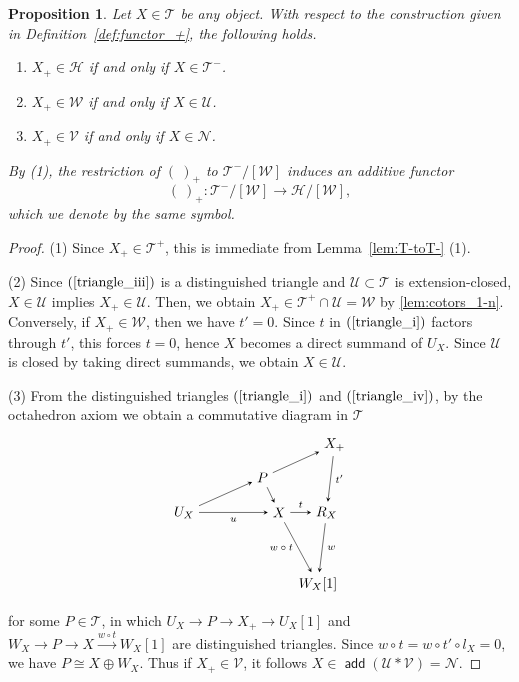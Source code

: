 \documentclass[a4paper,reqno,10pt]{amsart}
\newtheorem{proposition}[proposition]{Proposition}
\theoremstyle{definition}
\theoremstyle{definition}
\theoremstyle{definition}
\theoremstyle{definition}
\theoremstyle{plain}
\def\add{\operatorname{\mathsf{add}}}
\newcommand{\CH}{\mathcal{H}}
\newcommand{\CN}{\mathcal{N}}
\newcommand{\CT}{\mathcal{T}}
\newcommand{\CU}{\mathcal{U}}
\newcommand{\CV}{\mathcal{V}}
\newcommand{\CW}{\mathcal{W}}
\begin{document}
\begin{proposition}\label{prop:functor_+_property}
Let $X\in\CT$ be any object. With respect to the construction given in Definition~\ref{def:functor_+}, the following holds.
\begin{enumerate}
\item %
$X_+\in \CH$ if and only if $X\in\CT^-$. 
\normalcolor
\item $X_+\in\CW$ if and only if $X\in\CU$. 
\item $X_+\in\CV$ if and only if $X\in\CN$. 
\end{enumerate}
By {\rm (1)}, the restriction of $(\ )_+$ to $\CT^-/[\CW]$ induces an additive functor
\[
(\ )_+\colon\CT^-/[\CW]\longrightarrow\CH/[\CW],
\]
which we denote by the same symbol.
\end{proposition}
\begin{proof}
{\rm (1)} 
Since $X_+\in\CT^+$, this is immediate 
from Lemma~\ref{lem:T-toT-} {\rm (1)}.
\normalcolor

{\rm (2)} Since $(\ref{triangle_iii})$ is a distinguished triangle and $\CU\subset\CT$ is extension-closed, $X\in\CU$ implies $X_+\in\CU$. Then, we obtain $X_+\in\CT^+\cap\CU=\CW$
by \cref{lem:cotors_1-n}.
\normalcolor
Conversely, if $X_+\in\CW$, then we have $t'=0$. Since $t$ in $(\ref{triangle_i})$ factors through $t'$, this forces $t=0$, hence $X$ becomes a direct summand of $U_X$. Since $\CU$ is closed by taking direct summands, we obtain $X\in\CU$.  

{\rm (3)} From the distinguished triangles $(\ref{triangle_i})$ and $(\ref{triangle_iv})$, by the octahedron axiom we obtain a commutative diagram in $\CT$
\[
\begin{tikzpicture}[>=stealth]
\node (1) at (-2.4,0) {$U_X$};
\node (2) at (-0.42,0.88) {$P$};
\node (3) at (1.4,1.7) {$X_+$};
\node (4) at (0,0) {$X$};
\node (5) at (1.2,0) {$R_X$};
\node (6) at (0.98,-1.8) {$W_X[1]$};
\draw[->] (1) -- (2);
\draw[->] (1) -- node[below,font=\scriptsize] {$u$} (4);
\draw[->] (2) -- (3);
\draw[->] (2) -- (4);
\draw[->] (3) -- node[right,font=\scriptsize] {$t'$} (5);
\draw[->] (4) -- node[above,font=\scriptsize] {$t$} (5);
\draw[->] (4) -- node[left,font=\scriptsize] {$w\circ t$} (6);
\draw[->] (5) -- node[right,font=\scriptsize] {$w$} (6);
\end{tikzpicture}
\]
for some $P\in\CT$, in which $U_X\to P\to X_+\to U_X[1]$ and $W_X\to P\to X\xrightarrow{w\circ t}W_X[1]$ are distinguished triangles. Since $w\circ t=w\circ t'\circ l_X=0$, we have $P\cong X\oplus W_X$. Thus if $X_+\in\CV$, it follows $X\in\add(\CU\ast\CV)=\CN$.


\end{proof}
\end{document}
